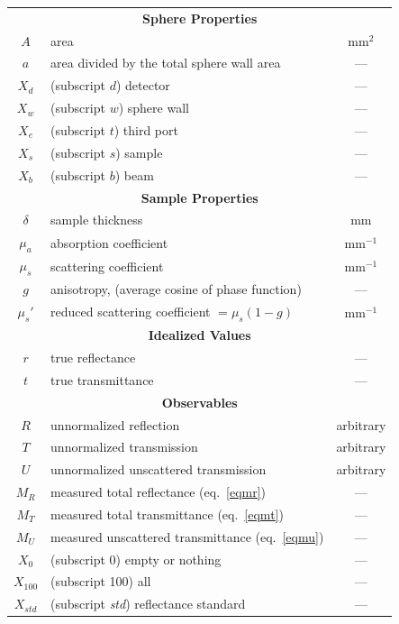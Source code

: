 \documentclass{article}
\begin{document}
\newpage
\tableofcontents 

\newpage

\begin{table}[b]
\centering
\begin{tabular}{cp{7cm}c}
\multicolumn{3}{c}{\textbf{Sphere Properties}}\\
$A$   & area&	mm$^2$\\
$a$   & area divided by the total sphere wall area& ---\\[2mm]
$X_d$ & (subscript $d$) detector    & ---\\
$X_w$ & (subscript $w$) sphere wall & ---\\
$X_e$ & (subscript $t$) third port  & ---\\
$X_s$ & (subscript $s$) sample      & ---\\
$X_b$ & (subscript $b$) beam        & ---\\[8mm]
%
%
\multicolumn{3}{c}{\textbf{Sample Properties}}\\
$\delta$ & sample thickness & mm\\
$\mu_a$  & absorption coefficient 				&	mm$^{-1}$\\
$\mu_s$  & scattering coefficient 				&	mm$^{-1}$\\
$g$      & anisotropy, (average cosine of phase function) & --- \\
$\mu_s'$ & reduced scattering coefficient $=\mu_s(1-g)$&	mm$^{-1}$\\[8mm]
%
%
\multicolumn{3}{c}{\textbf{Idealized Values}}\\
$r$ & true reflectance & ---\\
$t$ & true transmittance & ---\\[8mm]
%
%
\multicolumn{3}{c}{\textbf{Observables}}\\
$R$ & unnormalized reflection & arbitrary\\
$T$ & unnormalized transmission & arbitrary\\
$U$ & unnormalized unscattered transmission & arbitrary\\[2mm]
$M_R$ & measured total reflectance (eq.~\ref{eqmr})&	---\\
$M_T$ & measured total transmittance (eq.~\ref{eqmt})&	---\\
$M_U$ & measured unscattered transmittance (eq.~\ref{eqmu})&	---\\[2mm]
$X_0$   & (subscript 0) empty or nothing & --- \\
$X_{100}$   & (subscript 100) all & --- \\
$X_\mathit{std}$ & (subscript \textit{std}) reflectance standard & ---\\

\end{tabular}
\end{table}
\end{document}
